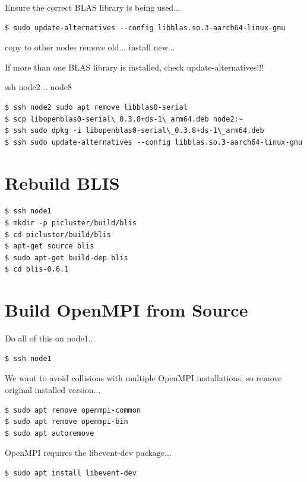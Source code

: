 \documentclass{report}
\begin{document}
Ensure the correct BLAS library is being used...

\lstset{style=termstyle}
\begin{lstlisting}
$ sudo update-alternatives --config libblas.so.3-aarch64-linux-gnu
\end{lstlisting}

copy to other nodes
remove old...
install new...

If more than one BLAS library is installed, check update-alternatives!!!

ssh node2 .. node8
\lstset{style=termstyle}
\begin{lstlisting}
$ ssh node2 sudo apt remove libblas0-serial
$ scp libopenblas0-serial\_0.3.8+ds-1\_arm64.deb node2:~
$ ssh sudo dpkg -i libopenblas0-serial\_0.3.8+ds-1\_arm64.deb
$ ssh sudo update-alternatives --config libblas.so.3-aarch64-linux-gnu
\end{lstlisting}


%
%
\chapter{Rebuild BLIS}

\lstset{style=termstyle}
\begin{lstlisting}
$ ssh node1
$ mkdir -p picluster/build/blis
$ cd picluster/build/blis
$ apt-get source blis
$ sudo apt-get build-dep blis
$ cd blis-0.6.1
\end{lstlisting}


%
%

\chapter{Build OpenMPI from Source}

Do all of this on node1...

\lstset{style=termstyle}
\begin{lstlisting}
$ ssh node1
\end{lstlisting}

We want to avoid collisions with multiple OpenMPI installations, so remove original installed version...

\lstset{style=termstyle}
\begin{lstlisting}
$ sudo apt remove openmpi-common
$ sudo apt remove openmpi-bin
$ sudo apt autoremove 
\end{lstlisting}

OpenMPI requires the libevent-dev package...

\lstset{style=termstyle}
\begin{lstlisting}
$ sudo apt install libevent-dev
\end{lstlisting}
\end{document}
